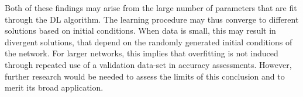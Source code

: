 Both of these findings may arise from the large number of parameters that are
fit through the DL algorithm. The learning procedure may thus converge to
different solutions based on initial conditions. When data is small, this may
result in divergent solutions, that depend on the randomly generated initial
conditions of the network. For larger networks, this implies that overfitting is
not induced through repeated use of a validation data-set in accuracy
assessments. However, further research would be needed to assess the limits of
this conclusion and to merit its broad application.
